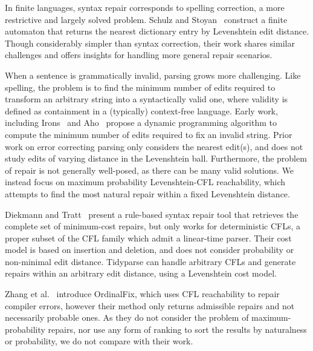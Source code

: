\documentclass[sigplan,review,acmsmall,nonacm,screen,anonymous]{acmart}\settopmatter{printfolios=false,printccs=false,printacmref=false}
\begin{document}
In finite languages, syntax repair corresponds to spelling correction, a more restrictive and largely solved problem. Schulz and Stoyan~\cite{schulz2002fast} construct a finite automaton that returns the nearest dictionary entry by Levenshtein edit distance. Though considerably simpler than syntax correction, their work shares similar challenges and offers insights for handling more general repair scenarios.

When a sentence is grammatically invalid, parsing grows more challenging. Like spelling, the problem is to find the minimum number of edits required to transform an arbitrary string into a syntactically valid one, where validity is defined as containment in a (typically) context-free language. Early work, including Irons~\cite{irons1963error} and Aho~\cite{aho1972minimum} propose a dynamic programming algorithm to compute the minimum number of edits required to fix an invalid string. Prior work on error correcting parsing only considers the nearest edit(s), and does not study edits of varying distance in the Levenshtein ball. Furthermore, the problem of repair is not generally well-posed, as there can be many valid solutions. We instead focus on maximum probability Levenshtein-CFL reachability, which attempts to find the most natural repair within a fixed Levenshtein distance.

Diekmann and Tratt~\cite{diekmann2018dont} present a rule-based syntax repair tool that retrieves the complete set of minimum-cost repairs, but only works for deterministic CFLs, a proper subset of the CFL family which admit a linear-time parser. Their cost model is based on insertion and deletion, and does not consider probability or non-minimal edit distance. Tidyparse can handle arbitrary CFLs and generate repairs within an arbitrary edit distance, using a Levenshtein cost model.

Zhang et al.~\cite{zhang2023ordinalfix} introduce OrdinalFix, which uses CFL reachability to repair compiler errors, however their method only returns admissible repairs and not necessarily probable ones. As they do not consider the problem of maximum-probability repairs, nor use any form of ranking to sort the results by naturalness or probability, we do not compare with their work.
\end{document}
